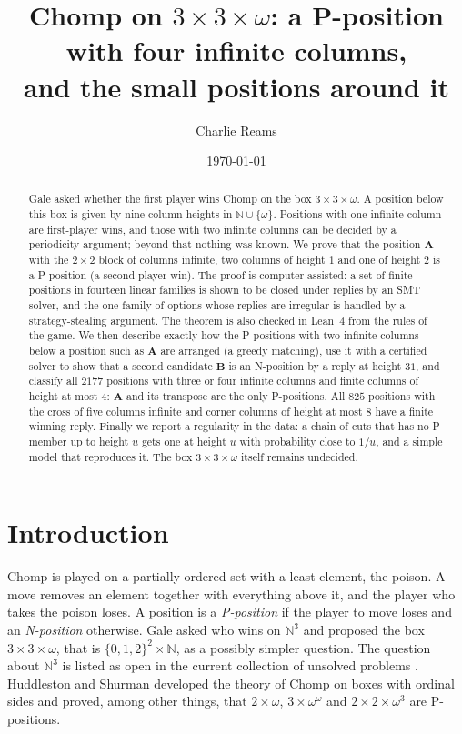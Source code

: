 \documentclass[11pt]{amsart}
\title[Chomp on $3\times3\times\omega$]{Chomp on $3\times 3\times\omega$: a P-position with four
infinite columns,\\ and the small positions around it}
\author{Charlie Reams}
\date{\today}
\theoremstyle{definition}
\theoremstyle{remark}
\newcommand{\PA}{\mathbf{A}}
\newcommand{\PB}{\mathbf{B}}
\begin{document}
\begin{abstract}
Gale asked whether the first player wins Chomp on the box $3\times3\times\omega$. A position
below this box is given by nine column heights in $\mathbb N\cup\{\omega\}$. Positions with one
infinite column are first-player wins, and those with two infinite columns can be decided by a
periodicity argument; beyond that nothing was known. We prove that the position $\PA$ with the
$2\times2$ block of columns infinite, two columns of height $1$ and one of height $2$ is a
P-position (a second-player win). The proof is computer-assisted: a set of finite positions in
fourteen linear families is shown to be closed under replies by an SMT solver, and the one
family of options whose replies are irregular is handled by a strategy-stealing argument.
The theorem is also checked in Lean~4 from the rules of the game.
We then describe exactly how the P-positions with two infinite columns below a position such as
$\PA$ are arranged (a greedy matching), use it with a certified solver to show that a second
candidate $\PB$ is an N-position by a reply at height $31$, and classify all $2177$ positions
with three or four infinite columns and finite columns of height at most $4$: $\PA$ and its
transpose are the only P-positions. All $825$ positions with the cross of five columns infinite
and corner columns of height at most $8$ have a finite winning reply. Finally we report a
regularity in the data: a chain of cuts that has no P member up to height $u$ gets one at
height $u$ with probability close to $1/u$, and a simple model that reproduces it. The box $3\times3\times\omega$ itself remains
undecided.
\end{abstract}
\maketitle

\section{Introduction}

Chomp is played on a partially ordered set with a least element, the poison. A move removes
an element together with everything above it, and the player who takes the poison loses. A
position is a \emph{P-position} if the player to move loses and an \emph{N-position} otherwise.
Gale \cite{Gale} asked who wins on $\mathbb N^3$ and proposed the box $3\times3\times\omega$,
that is $\{0,1,2\}^2\times\mathbb N$, as a possibly simpler question. The question about
$\mathbb N^3$ is listed as open in the current collection of unsolved problems \cite[D1]{Now}. Huddleston and Shurman
\cite{HS} developed the theory of Chomp on boxes with ordinal sides and proved, among other
things, that $2\times\omega$, $3\times\omega^\omega$ and $2\times2\times\omega^3$ are P-positions.
\end{document}
